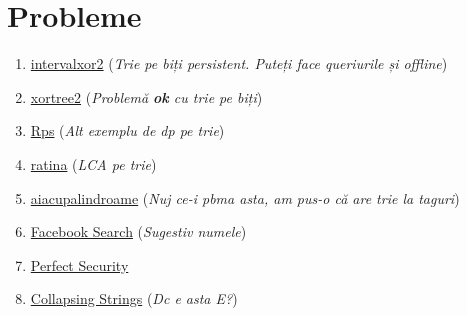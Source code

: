 \section{Probleme}

\begin{enumerate}
    \item \href{https://kilonova.ro/problems/456}{intervalxor2} (\textit{Trie pe biți persistent. Puteți face queriurile și offline})
    \item \href{https://kilonova.ro/problems/361}{xortree2} (\textit{Problemă \textbf{ok} cu trie pe biți})
    \item \href{https://kilonova.ro/problems/371}{Rps} (\textit{Alt exemplu de dp pe trie})
    \item \href{https://www.infoarena.ro/problema/ratina}{ratina}  (\textit{LCA pe trie})
    \item \href{https://www.infoarena.ro/problema/aiacupalindroame}{aiacupalindroame} (\textit{Nuj ce-i pbma asta, am pus-o că are trie la taguri})
    \item \href{https://www.infoarena.ro/problema/fbsearch}{Facebook Search}  (\textit{Sugestiv numele})
    \item \href{https://codeforces.com/contest/948/problem/D}{Perfect Security}
    \item \href{https://codeforces.com/contest/1902/problem/E}{Collapsing Strings}  (\textit{Dc e asta E?})
\end{enumerate}